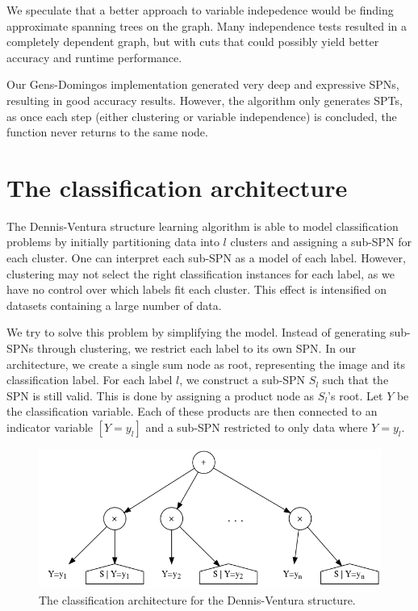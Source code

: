 We speculate that a better approach to variable indepedence would be finding approximate spanning
trees on the graph. Many independence tests resulted in a completely dependent graph, but with
cuts that could possibly yield better accuracy and runtime performance.

Our Gens-Domingos implementation generated very deep and expressive SPNs, resulting in good
accuracy results. However, the algorithm only generates SPTs, as once each step (either clustering
or variable independence) is concluded, the function never returns to the same node.

\section{The classification architecture}

The Dennis-Ventura structure learning algorithm is able to model classification problems by
initially partitioning data into $l$ clusters and assigning a sub-SPN for each cluster. One can
interpret each sub-SPN as a model of each label. However, clustering may not select the right
classification instances for each label, as we have no control over which labels fit each cluster.
This effect is intensified on datasets containing a large number of data.

We try to solve this problem by simplifying the model. Instead of generating sub-SPNs through
clustering, we restrict each label to its own SPN\@. In our architecture, we create a single sum
node as root, representing the image and its classification label. For each label $l$, we construct
a sub-SPN $S_l$ such that the SPN is still valid. This is done by assigning a product node as
$S_l$'s root. Let $Y$ be the classification variable. Each of these products are then connected to
an indicator variable $[Y=y_l]$ and a sub-SPN restricted to only data where $Y=y_l$.

\begin{figure}[h]
  \centering\includegraphics[scale=0.5]{graphs/classarch.png}
  \caption{The classification architecture for the Dennis-Ventura structure.\label{fig:class_arch}}
\end{figure}


